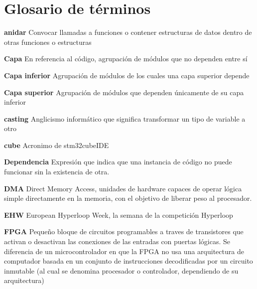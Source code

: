\documentclass{report}
\begin{document}
\setcounter{tocdepth}{3}
\setcounter{secnumdepth}{3}
\newpage
\setlength{\cftbeforetoctitleskip}{-3em}
\tableofcontents
\newpage

\section{Glosario de términos}
\setlength{\parindent}{0cm}

\textbf{anidar} Convocar llamadas a funciones o contener estructuras de datos dentro de otras funciones o estructuras
\par \vspace{0.2 cm}
\textbf{Capa} En referencia al código, agrupación de módulos que no dependen entre sí
\par \vspace{0.2 cm}
\textbf{Capa inferior} Agrupación de módulos de los cuales una capa superior depende
\par \vspace{0.2 cm}
\textbf{Capa superior} Agrupación de módulos que dependen únicamente de su capa inferior
\par \vspace{0.2 cm}
\textbf{casting} Anglicismo informático que significa transformar un tipo de variable a otro
\par \vspace{0.2 cm}
\textbf{cube} Acronimo de stm32cubeIDE
\par \vspace{0.2 cm}
\textbf{Dependencia} Expresión que indica que una instancia de código no puede funcionar sin la existencia de otra. 
\par \vspace{0.2 cm}
\textbf{DMA} Direct Memory Access, unidades de hardware capaces de operar lógica simple directamente en la memoria, con el objetivo de liberar peso al procesador. 
\par \vspace{0.2 cm}
\textbf{EHW} European Hyperloop Week, la semana de la competición Hyperloop
\par \vspace{0.2 cm}
\textbf{FPGA} Pequeño bloque de circuitos programables a traves de transistores que activan o desactivan las conexiones de las entradas con puertas lógicas. Se diferencia de un microcontrolador en que la FPGA no usa una arquitectura de computador basada en un conjunto de instrucciones decodificadas por un circuito inmutable (al cual se denomina procesador o controlador, dependiendo de su arquitectura)
\end{document}
